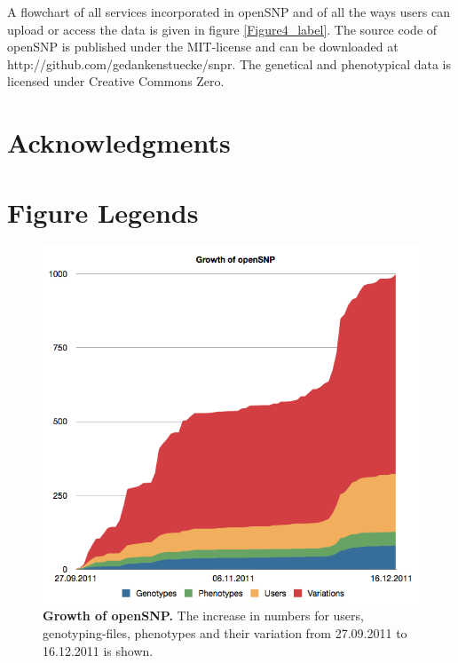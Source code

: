 \documentclass[10pt]{article}
\begin{document}
A flowchart of all services incorporated in openSNP and of all the ways users can upload or access the data is given in figure \ref{Figure4_label}. The source code of openSNP is 
published under the MIT-license and can be downloaded at http://github.com/gedankenstuecke/snpr. The genetical and phenotypical data is licensed under Creative Commons Zero. 
\section*{Acknowledgments}




\section*{Figure Legends}
\begin{figure}[!ht]
	\begin{center}
		\includegraphics[scale=0.35]{chart_growth.png}
	\end{center}
	\caption{
	{\bf Growth of openSNP.} The increase in numbers for users, genotyping-files, phenotypes and their variation from 27.09.2011 to 16.12.2011 is shown.} 
	\label{Figure1_label}
\end{figure}
\end{document}
